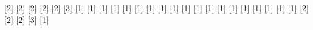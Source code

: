 \newtextcommand{\partial}
\newtextcommand{\qed}
\newtextcommand{\mod}
\newtextcommand{\pmod}
\newtextcommand{\bottom}
\newtextcommand{\neg}
\newtextcommand{\neq}
\newtextcommand{\ne}
\newtextcommand{\shortmid}
\newtextcommand{\mid}
\newtextcommand{\int}
\newtextcommand{\integral}
\newtextcommand{\iint}
\newtextcommand{\doubleintegral}
\newtextcommand{\iiint}
\newtextcommand{\tripleintegral}
\newtextcommand{\iiiint}
\newtextcommand{\quadrupleintegral}
\newtextcommand{\oint}
\newtextcommand{\conint}
\newtextcommand{\contourintegral}
\newtextcommand{\times}
\newtextcommand{\star}
\newtextcommand{\circleddash}
\newtextcommand{\odash}
\newtextcommand{\intercal}
\newtextcommand{\smallfrown}
\newtextcommand{\smallsmile}
\newtextcommand{\boxminus}
\newtextcommand{\minusb}
\newtextcommand{\boxplus}
\newtextcommand{\plusb}
\newtextcommand{\boxtimes}
\newtextcommand{\timesb}
\newtextcommand{\sum}
\newtextcommand{\prod}
\newtextcommand{\product}
\newtextcommand{\coprod}
\newtextcommand{\coproduct}
\newtextcommand{\otimes}
\newtextcommand{\Otimes}
\newtextcommand{\bigotimes}
\newtextcommand{\ominus}
\newtextcommand{\oslash}
\newtextcommand{\oplus}
\newtextcommand{\Oplus}
\newtextcommand{\bigoplus}
\newtextcommand{\bigodot}
\newtextcommand{\bigsqcap}
\newtextcommand{\bigsqcup}
\newtextcommand{\biguplus}
\newtextcommand{\biginterleave}
\newtextcommand{\wedge}
\newtextcommand{\Wedge}
\newtextcommand{\bigwedge}
\newtextcommand{\Vee}
\newtextcommand{\bigvee}
\newtextcommand{\invamp}
\newtextcommand{\parr}
\newtextcommand{\frac}[2]
\newtextcommand{\tfrac}[2]
\newtextcommand{\binom}[2]
\newtextcommand{\tbinom}[2]
\newtextcommand{\tensor}[2]
\newtextcommand{\multiscripts}[3]
\newtextcommand{\overbrace}[1]
\newtextcommand{\underbrace}[1]
\newtextcommand{\underline}[1]
\newtextcommand{\bar}[1]
\newtextcommand{\overline}[1]
\newtextcommand{\closure}[1]
\newtextcommand{\widebar}[1]
\newtextcommand{\vec}[1]
\newtextcommand{\widevec}[1]
\newtextcommand{\dot}[1]
\newtextcommand{\ddot}[1]
\newtextcommand{\dddot}[1]
\newtextcommand{\ddddot}[1]
\newtextcommand{\tilde}[1]
\newtextcommand{\widetilde}[1]
\newtextcommand{\check}[1]
\newtextcommand{\widecheck}[1]
\newtextcommand{\hat}[1]
\newtextcommand{\widehat}[1]
\newtextcommand{\underset}[2]
\newtextcommand{\stackrel}[2]
\newtextcommand{\overset}[2]
\newtextcommand{\over}
\newtextcommand{\atop}
\newtextcommand{\underoverset}[3]
\newtextcommand{\sqrt}[1]
\newtextcommand{\root}
\newtextcommand{\statusline}
\newtextcommand{\tooltip}
\newtextcommand{\toggle}
\newtextcommand{\fghilight}
\newtextcommand{\fghighlight}
